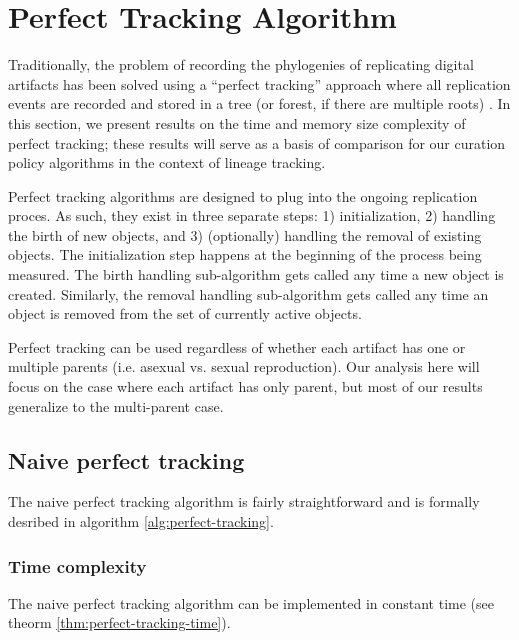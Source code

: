 \section{Perfect Tracking Algorithm} \label{sec:perfect-tracking}

Traditionally, the problem of recording the phylogenies of replicating digital 
artifacts has been solved using a ``perfect tracking'' approach where all replication 
events are recorded and stored in a tree (or forest, if there are multiple roots) \citep{dolson2023phylotrackpy}.
In this section, we present results on the time and memory size complexity of perfect tracking;
these results will serve as a basis of comparison for our curation policy algorithms in the context
of lineage tracking.

Perfect tracking algorithms are designed to plug into the ongoing replication proces.
As such, they exist in three separate steps: 1) initialization, 2) handling the birth of new objects, and 3) (optionally) handling the removal of existing objects.
The initialization step happens at the beginning of the process being measured.
The birth handling sub-algorithm gets called any time a new object is created.
Similarly, the removal handling sub-algorithm gets called any time an object is removed from the set of currently active objects.

Perfect tracking can be used regardless of whether each artifact has one or multiple parents (i.e. asexual vs. sexual reproduction).
Our analysis here will focus on the case where each artifact has only parent, but most of our results generalize to the multi-parent case.


\subsection{Naive perfect tracking}

The naive perfect tracking algorithm is fairly straightforward and is formally desribed in algorithm \ref{alg:perfect-tracking}. 



\subsubsection{Time complexity}

The naive perfect tracking algorithm can be implemented in constant time (see theorm \ref{thm:perfect-tracking-time}).



